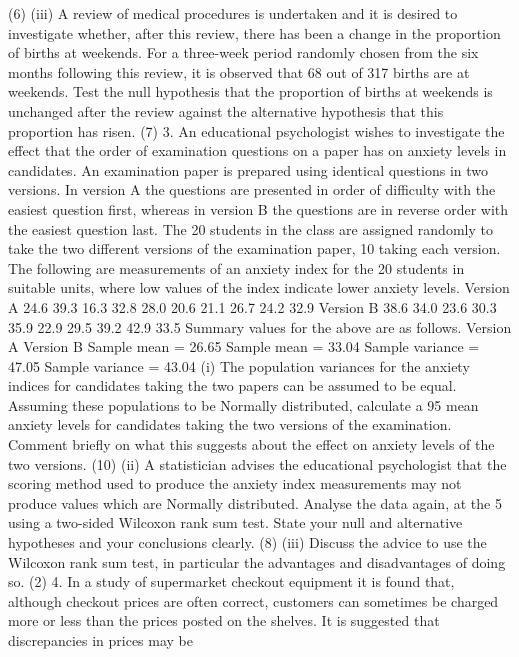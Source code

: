 (6)
(iii) A review of medical procedures is undertaken and it is desired to investigate
whether, after this review, there has been a change in the proportion of births at
weekends. For a three-week period randomly chosen from the six months
following this review, it is observed that 68 out of 317 births are at weekends.
Test the null hypothesis that the proportion of births at weekends is unchanged
after the review against the alternative hypothesis that this proportion has risen.
(7)
3. An educational psychologist wishes to investigate the effect that the order of
examination questions on a paper has on anxiety levels in candidates. An examination
paper is prepared using identical questions in two versions. In version A the questions
are presented in order of difficulty with the easiest question first, whereas in version B
the questions are in reverse order with the easiest question last.
The 20 students in the class are assigned randomly to take the two different versions of
the examination paper, 10 taking each version. The following are measurements of an
anxiety index for the 20 students in suitable units, where low values of the index
indicate lower anxiety levels.
Version A 24.6 39.3 16.3 32.8 28.0 20.6 21.1 26.7 24.2 32.9
Version B 38.6 34.0 23.6 30.3 35.9 22.9 29.5 39.2 42.9 33.5
Summary values for the above are as follows.
Version A Version B
Sample mean = 26.65 Sample mean = 33.04
Sample variance = 47.05 Sample variance = 43.04
(i) The population variances for the anxiety indices for candidates taking the two
papers can be assumed to be equal. Assuming these populations to be
Normally distributed, calculate a 95%
mean anxiety levels for candidates taking the two versions of the examination.
Comment briefly on what this suggests about the effect on anxiety levels of the
two versions.
(10)
(ii) A statistician advises the educational psychologist that the scoring method used
to produce the anxiety index measurements may not produce values which are
Normally distributed. Analyse the data again, at the 5%
using a two-sided Wilcoxon rank sum test. State your null and alternative
hypotheses and your conclusions clearly.
(8)
(iii) Discuss the advice to use the Wilcoxon rank sum test, in particular the
advantages and disadvantages of doing so.
(2)
4. In a study of supermarket checkout equipment it is found that, although checkout
prices are often correct, customers can sometimes be charged more or less than the
prices posted on the shelves. It is suggested that discrepancies in prices may be
